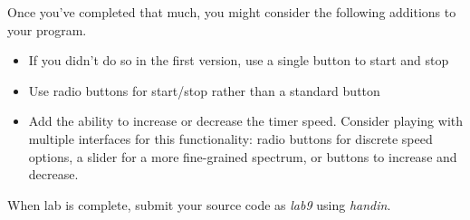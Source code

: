 \documentclass[nobib]{tufte-handout}
\begin{document}
Once you've completed that much, you might consider the following additions to your program.
\begin{itemize}
\item If you didn't do so in the first version, use a single button to start and stop
\item Use radio buttons for start/stop rather than a standard button
\item Add the ability to increase or decrease the timer speed. Consider playing with multiple interfaces for this functionality: radio buttons for discrete speed options, a slider for a more fine-grained spectrum, or buttons to increase and decrease. 
\end{itemize}

When lab is complete, submit your source code as \textit{lab9} using \textit{handin}.
\end{document}
